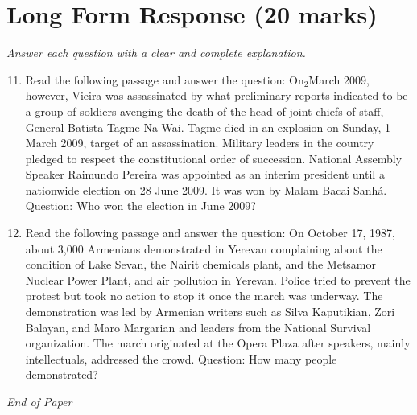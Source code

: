 \documentclass[12pt]{article}
\begin{document}
\section*{Long Form Response (20 marks)}
\textit{Answer each question with a clear and complete explanation.}
\begin{enumerate}[label=\arabic*.]
\setcounter{enumi}{10}
\item Read the following passage and answer the question: On$_{2}$March 2009, however, Vieira was assassinated by what preliminary reports indicated to be a group of soldiers avenging the death of the head of joint chiefs of staff, General Batista Tagme Na Wai. Tagme died in an explosion on Sunday, 1 March 2009, target of an assassination. Military leaders in the country pledged to respect the constitutional order of succession. National Assembly Speaker Raimundo Pereira was appointed as an interim president until a nationwide election on 28 June 2009. It was won by Malam Bacai Sanhá. Question: Who won the election in June 2009?
\item Read the following passage and answer the question: On October 17, 1987, about 3,000 Armenians demonstrated in Yerevan complaining about the condition of Lake Sevan, the Nairit chemicals plant, and the Metsamor Nuclear Power Plant, and air pollution in Yerevan. Police tried to prevent the protest but took no action to stop it once the march was underway. The demonstration was led by Armenian writers such as Silva Kaputikian, Zori Balayan, and Maro Margarian and leaders from the National Survival organization. The march originated at the Opera Plaza after speakers, mainly intellectuals, addressed the crowd. Question: How many people demonstrated?
\end{enumerate}

\vfill
\noindent\textit{End of Paper}
\end{document}

